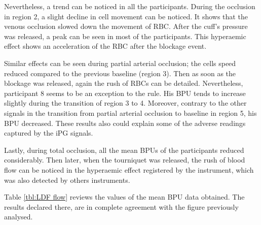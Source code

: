 Nevertheless, a trend can be noticed in all the participants. During the occlusion in region 2, a slight decline in cell movement can be noticed. It shows that the venous occlusion slowed down the movement of RBC. After the cuff's pressure was released, a peak can be seen in most of the participants. This hyperaemic effect shows an acceleration of the RBC after the blockage event. 

Similar effects can be seen during partial arterial occlusion; the cells speed reduced compared to the previous baseline (region 3). Then as soon as the blockage was released, again the rush of RBCs can be detailed. Nevertheless, participant 8 seems to be an exception to the rule. His BPU tends to increase slightly during the transition of region 3 to 4. Moreover, contrary to the other signals in the transition from partial arterial occlusion to baseline in region 5, his BPU decreased. These results also could explain some of the adverse readings captured by the iPG signals.

Lastly, during total occlusion, all the mean BPUs of the participants reduced considerably. Then later, when the tourniquet was released, the rush of blood flow can be noticed in the hyperaemic effect registered by the instrument, which was also detected by others instruments.

Table \ref{tbl:LDF flow} reviews the values of the mean BPU data obtained. The results declared there, are in complete agreement with the figure previously analysed.

